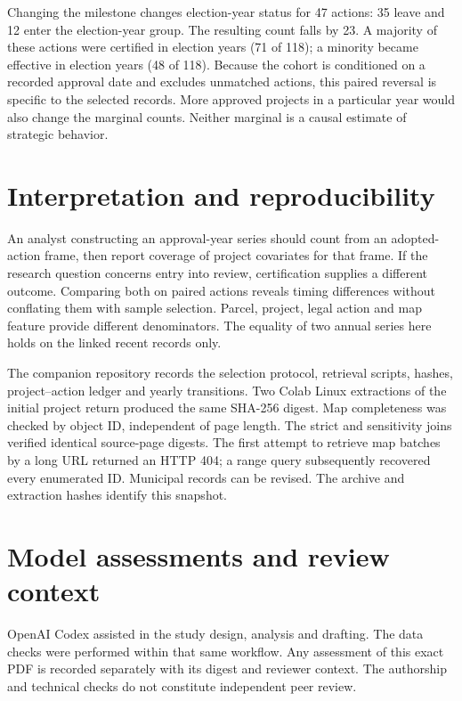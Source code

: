\documentclass[11pt]{article}
\begin{document}
Changing the milestone changes election-year status for 47 actions: 35 leave and 12 enter the election-year group. The resulting count falls by 23. A majority of these actions were certified in election years (71 of 118); a minority became effective in election years (48 of 118). Because the cohort is conditioned on a recorded approval date and excludes unmatched actions, this paired reversal is specific to the selected records. More approved projects in a particular year would also change the marginal counts. Neither marginal is a causal estimate of strategic behavior.

\section{Interpretation and reproducibility}
An analyst constructing an approval-year series should count from an adopted-action frame, then report coverage of project covariates for that frame. If the research question concerns entry into review, certification supplies a different outcome. Comparing both on paired actions reveals timing differences without conflating them with sample selection. Parcel, project, legal action and map feature provide different denominators. The equality of two annual series here holds on the linked recent records only.

The companion repository records the selection protocol, retrieval scripts, hashes, project--action ledger and yearly transitions. Two Colab Linux extractions of the initial project return produced the same SHA-256 digest. Map completeness was checked by object ID, independent of page length. The strict and sensitivity joins verified identical source-page digests. The first attempt to retrieve map batches by a long URL returned an HTTP 404; a range query subsequently recovered every enumerated ID. Municipal records can be revised. The archive and extraction hashes identify this snapshot.

\section*{Model assessments and review context}
OpenAI Codex assisted in the study design, analysis and drafting. The data checks were performed within that same workflow. Any assessment of this exact PDF is recorded separately with its digest and reviewer context. The authorship and technical checks do not constitute independent peer review.
\end{document}
